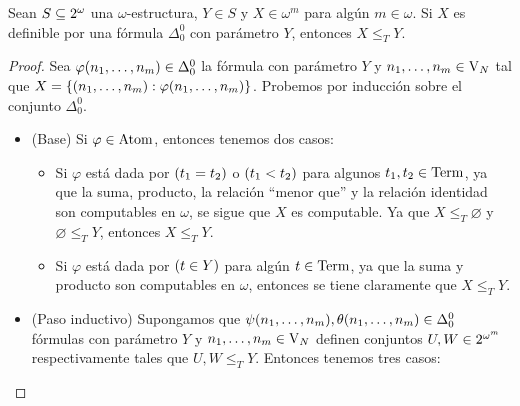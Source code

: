 \begin{lemma}
	\label{lemma: delta0_implica_computable}
	Sean $S\subseteq\CPOTENCIA{\omega}$ una $\omega$-estructura, $Y\in S$ y $X\in\omega^{m}$ para algún $m\in\omega$. Si $X$ es definible por una fórmula $\Delta_{0}^{0}$ con parámetro $Y$, entonces $X\leq_{T} Y$.
\end{lemma}

\begin{proof}
	Sea $\varphi\pa*{n_{1},\dotsc, n_{m}}\in\Delta_{0}^{0}$ la fórmula con parámetro $Y$ y $n_{1},\dotsc, n_{m}\in\VARIABLES[N]$ tal que $X =\set*{\pa*{n_{1},\dotsc, n_{m}}:\varphi\pa*{n_{1},\dotsc, n_{m}}}$. Probemos por inducción sobre el conjunto $\Delta_{0}^{0}$.

	\begin{itemize}
		\item (Base) Si $\varphi\in\ATOMICAS$, entonces tenemos dos casos:

		\begin{itemize}
			\item Si $\varphi$ está dada por $\pa*{t_{1} = t_{2}}$ o $\pa*{t_{1} < t_{2}}$ para algunos $t_{1}, t_{2}\in\TERMINOS$, ya que la suma, producto, la relación ``menor que'' y la relación identidad son computables en $\omega$, se sigue que $X$ es computable. Ya que $X\leq_{T}\varnothing$ y $\varnothing\leq_{T} Y$, entonces $X\leq_{T} Y$.
			\item Si $\varphi$ está dada por $\pa*{t\in Y}$ para algún $t\in\TERMINOS$, ya que la suma y producto son computables en $\omega$, entonces se tiene claramente que $X\leq_{T} Y$.
		\end{itemize}

		\item (Paso inductivo) Supongamos que $\psi\pa*{n_{1},\dotsc, n_{m}},\theta\pa*{n_{1},\dotsc, n_{m}}\in\Delta_{0}^{0}$ fórmulas con parámetro $Y$ y $n_{1},\dotsc, n_{m}\in\VARIABLES[N]$ definen conjuntos $U, W\in\CPOTENCIA{\omega^{m}}$ respectivamente tales que $U, W\leq_{T} Y$. Entonces tenemos tres casos:


\end{itemize}
\end{proof}
